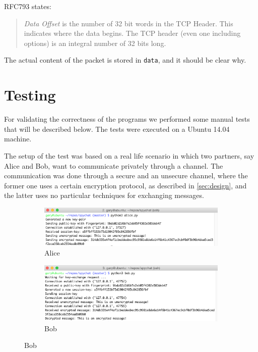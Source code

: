 \documentclass[11pt, a4paper]{article}
\begin{document}
RFC793 \cite{rfc793} states:

\begin{quote}
\textit{Data Offset} is the number of 32 bit words in the TCP Header.
This indicates where the data begins.  The TCP header (even one
including options) is an integral number of 32 bits long.
\end{quote}

The actual content of the packet is stored in \lstinline|data|, and it
should be clear why. 

\section{Testing}

For validating the correctness of the programs we performed some
manual tests that will be described below. The tests were executed on
a Ubuntu 14.04 machine. 

The setup of the test was based on a real life scenario in which two
partners, say Alice and Bob, want to communicate privately through a
channel. The communication was done through a secure and an unsecure
channel, where the former one uses a certain encryption protocol, as
described in \ref{sec:design}, and the latter uses no particular
techniques for exchanging messages.

\begin{figure}[H]
  \centering
  \begin{subfigure}[b]{0.49\textwidth}
    \includegraphics[width=\linewidth]{img/test_alice}
    \caption{Alice}
    \label{fig:test_alice}
  \end{subfigure}
  \begin{subfigure}[b]{0.49\textwidth}
    \includegraphics[width=\textwidth]{img/test_bob}
    \caption{Bob}
    \label{fig:test_bob}
  \end{subfigure}
\end{figure}
\end{document}
